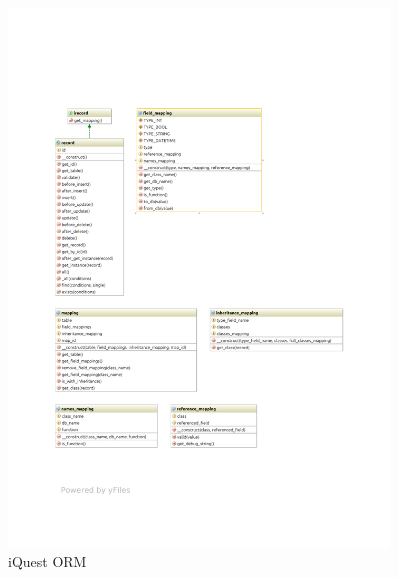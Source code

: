 \begin{figure}[H]
\begin{center}
\includegraphics[width=0.9\textwidth]{figures/lw/orm.pdf} 
\end{center}
\caption{iQuest ORM}\label{fig:iquest-orm}
\end{figure}

